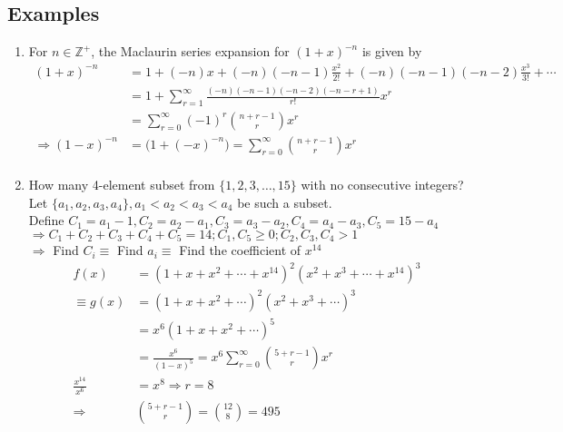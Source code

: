 \documentclass[a4paper]{article}
\begin{document}
\subsection*{Examples}
\begin{enumerate}
    \item For $n\in\mathbb{Z}^+$, the Maclaurin series expansion for $(1+x)^{-n}$ is given by
    \begin{align*}
        (1+x)^{-n}&=1+(-n)x+(-n)(-n-1)\frac{x^2}{2!}+(-n)(-n-1)(-n-2)\frac{x^3}{3!}+\cdots\\
        &=1+\sum_{r=1}^{\infty}{\frac{(-n)(-n-1)(-n-2)(-n-r+1)}{r!}x^r}\\
        &=\sum_{r=0}^{\infty}{(-1)^r\binom{n+r-1}{r} x^r}\\
        \Rightarrow (1-x)^{-n}&=\bigl(1+(-x)^{-n}\bigr)=\sum_{r=0}^{\infty}{\binom{n+r-1}{r} x^r}\\
    \end{align*}
    \item How many 4-element subset from $\{1,2,3,\ldots,15\}$ with no consecutive integers?\\
    Let $\{a_1,a_2,a_3,a_4\}, a_1<a_2<a_3<a_4$ be such a subset.\\
    Define $C_1=a_1-1,C_2=a_2-a_1,C_3=a_3-a_2,C_4=a_4-a_3,C_5=15-a_4$\\
    $\Rightarrow C_1+C_2+C_3+C_4+C_5=14;C_1,C_5\geq 0; C_2,C_3,C_4>1$\\
    $\Rightarrow$ Find $C_i \equiv$ Find $a_i \equiv$ Find the coefficient of $x^{14}$
    \begin{align*}
    f(x)&=(1+x+x^2+\cdots+x^{14})^2(x^2+x^3+\cdots+x^{14})^3\\
    \equiv g(x)&=(1+x+x^2+\cdots)^2(x^2+x^3+\cdots)^3\\
    &=x^6(1+x+x^2+\cdots)^5\\
    &=\frac{x^6}{(1-x)^5}=x^6\sum_{r=0}^{\infty}{\binom{5+r-1}{r}x^r}\\
    \frac{x^{14}}{x^6}&=x^8\Rightarrow r=8\\
    \Rightarrow&\binom{5+r-1}{r}=\binom{12}{8}=495
    \end{align*}
\end{enumerate}
\end{document}

